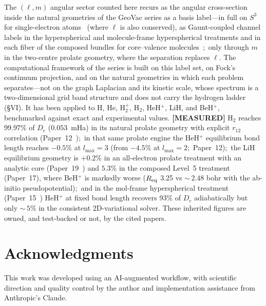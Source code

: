 \documentclass[aps,prl,reprint,amsmath,amssymb]{revtex4-2}
\begin{document}
The $(\ell, m)$ angular sector counted here recurs as the
angular cross-section inside the natural geometries of the GeoVac
series as a basis label---in full on $S^3$ for
single-electron atoms~\cite{paper7} (where $\ell$ is also conserved),
as Gaunt-coupled channel labels in the hyperspherical and
molecule-frame hyperspherical treatments and in each fiber of the
composed bundles for core--valence molecules~\cite{paper17};\ only
through $m$ in the two-centre prolate geometry, where the separation
replaces $\ell$.  The computational framework of the series
is built on this label set, on Fock's continuum projection, and on the
natural geometries in which each problem separates---not on the graph
Laplacian and its kinetic scale, whose spectrum is a two-dimensional
grid band structure and does not carry the hydrogen ladder (\S VI).
It has been applied to H, He, H$_2^+$, H$_2$, HeH$^+$, LiH, and
BeH$^+$, benchmarked against exact and experimental values.
\textbf{[MEASURED]} H$_2$ reaches $99.97\%$ of $D_e$ ($0.053$~mHa) in
its natural prolate geometry with explicit $r_{12}$ correlation
(Paper~12~\cite{paper12});\ in that same prolate engine the HeH$^+$
equilibrium bond length reaches $-0.5\%$ at $l_{\max} = 3$ (from
$-4.5\%$ at $l_{\max} = 2$;\ Paper~12);\ the LiH
equilibrium geometry is $+0.2\%$ in an all-electron prolate treatment
with an analytic core (Paper~19~\cite{paper19}) and $5.3\%$ in the
composed Level~5 treatment (Paper~17), where BeH$^+$ is markedly worse
($R_{\rm eq}$ 3.25 vs ${\sim}\,2.48$ bohr with the ab-initio
pseudopotential);\ and in the mol-frame hyperspherical treatment
(Paper~15~\cite{paper15}) HeH$^+$ at fixed bond length recovers 93\% of
$D_e$ adiabatically but only ${\sim}\,5\%$ in the consistent
2D-variational solver.  These inherited figures are owned, and
test-backed or not, by the cited papers.


\section*{Acknowledgments}

This work was developed using an AI-augmented workflow, with
scientific direction and quality control by the author and
implementation assistance from Anthropic's Claude.
\end{document}
